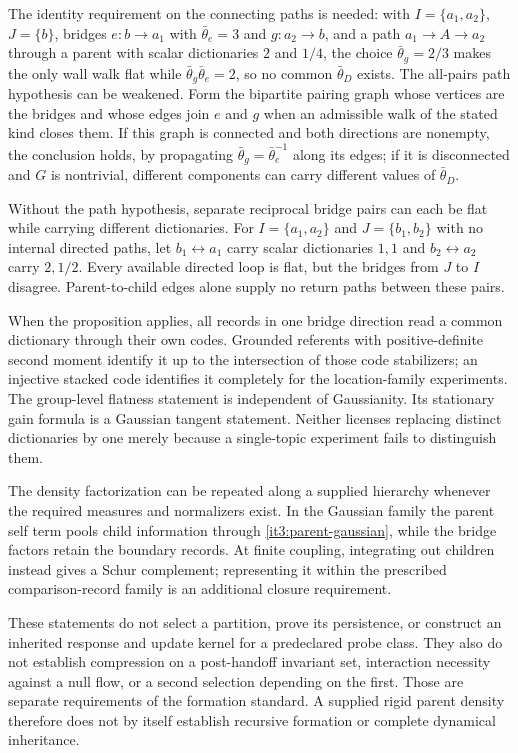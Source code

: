 The identity requirement on the connecting paths is needed: with $I=\{a_1,a_2\}$, $J=\{b\}$, bridges $e:b\to a_1$ with $\bar\theta_e=3$ and $g:a_2\to b$, and a path $a_1\to A\to a_2$ through a parent with scalar dictionaries $2$ and $1/4$, the choice $\bar\theta_g=2/3$ makes the only wall walk flat while $\bar\theta_g\bar\theta_e=2$, so no common $\bar\theta_D$ exists. The all-pairs path hypothesis can be weakened. Form the bipartite pairing graph whose vertices are the bridges and whose edges join $e$ and $g$ when an admissible walk of the stated kind closes them. If this graph is connected and both directions are nonempty, the conclusion holds, by propagating $\bar\theta_g=\bar\theta_e^{-1}$ along its edges; if it is disconnected and $G$ is nontrivial, different components can carry different values of $\bar\theta_D$.

Without the path hypothesis, separate reciprocal bridge pairs can each be flat while carrying different dictionaries. For $I=\{a_1,a_2\}$ and $J=\{b_1,b_2\}$ with no internal directed paths, let $b_1\leftrightarrow a_1$ carry scalar dictionaries $1,1$ and $b_2\leftrightarrow a_2$ carry $2,1/2$. Every available directed loop is flat, but the bridges from $J$ to $I$ disagree. Parent-to-child edges alone supply no return paths between these pairs.

When the proposition applies, all records in one bridge direction read a common dictionary through their own codes. Grounded referents with positive-definite second moment identify it up to the intersection of those code stabilizers; an injective stacked code identifies it completely for the location-family experiments. The group-level flatness statement is independent of Gaussianity. Its stationary gain formula is a Gaussian tangent statement. Neither licenses replacing distinct dictionaries by one merely because a single-topic experiment fails to distinguish them.

The density factorization can be repeated along a supplied hierarchy whenever the required measures and normalizers exist. In the Gaussian family the parent self term pools child information through \cref{it3:parent-gaussian}, while the bridge factors retain the boundary records. At finite coupling, integrating out children instead gives a Schur complement; representing it within the prescribed comparison-record family is an additional closure requirement.

These statements do not select a partition, prove its persistence, or construct an inherited response and update kernel for a predeclared probe class. They also do not establish compression on a post-handoff invariant set, interaction necessity against a null flow, or a second selection depending on the first. Those are separate requirements of the formation standard. A supplied rigid parent density therefore does not by itself establish recursive formation or complete dynamical inheritance.

